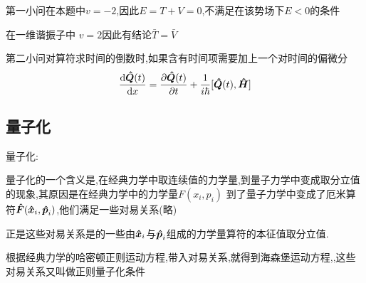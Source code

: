             第一小问在本题中$ v = -2 $,因此$ E = T + V = 0 $,不满足在该势场下$E<0$的条件

            在一维谐振子中 $ v = 2 $因此有结论$ \bar{T} = \bar{V} $

            第二小问对算符求时间的倒数时,如果含有时间项需要加上一个对时间的偏微分
            $$ \dv{\vu*{Q}(t)}{x} = \pdv{\vu*{Q}(t)}{t} + \frac{1}{i \hbar } [\vu*{Q}(t),\vu*{H}]$$

        \subsection{量子化}
            \begin{formal}
                量子化:

                量子化的一个含义是,在经典力学中取连续值的力学量,到量子力学中变成取分立值的现象,其原因是在经典力学中的力学量$F(x_{i},p_{i})$
                到了量子力学中变成了厄米算符$\vu*{F}(\vu*{x}_{i},\vu*{p}_{i})$,他们满足一些对易关系(略)

                正是这些对易关系是的一些由$\vu*{x}_{i}$与$\vu*{p}_{i}$组成的力学量算符的本征值取分立值.

                根据经典力学的哈密顿正则运动方程,带入对易关系,就得到海森堡运动方程,,这些对易关系又叫做正则量子化条件

            \end{formal}
    

